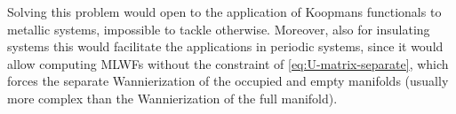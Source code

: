 Solving this problem would open to the application of Koopmans functionals to metallic systems, impossible to tackle otherwise. Moreover, also for insulating systems this would facilitate the applications in periodic systems, since it would allow computing MLWFs without the constraint of \cref{eq:U-matrix-separate}, which forces the separate Wannierization of the occupied and empty manifolds (usually more complex than the Wannierization of the full manifold).
